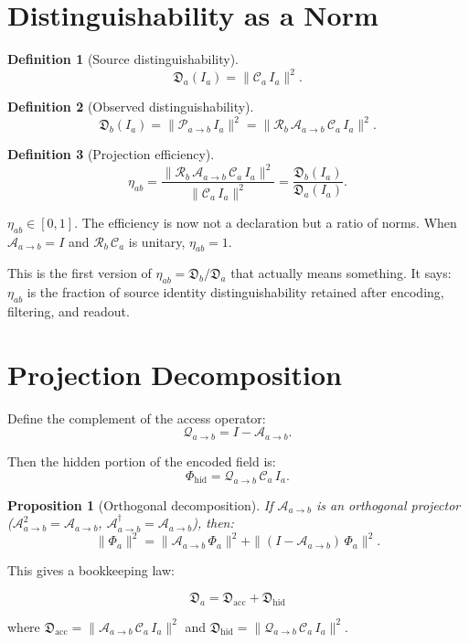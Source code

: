 \documentclass[11pt,a4paper,oneside]{article}
\newtheorem{definition}{Definition}[section]
\newtheorem{proposition}{Proposition}[section]
\newcommand{\Ia}{I_a}
\newcommand{\Pab}{\mathcal{P}_{a\to b}}
\newcommand{\Ca}{\mathcal{C}_a}
\newcommand{\Aab}{\mathcal{A}_{a\to b}}
\newcommand{\Rb}{\mathcal{R}_b}
\newcommand{\Qab}{\mathcal{Q}_{a\to b}}
\newcommand{\PhiA}{\Phi_a}              %
\newcommand{\PhiHid}{\Phi_{\mathrm{hid}}}  %
\newcommand{\Da}{\mathfrak{D}_a}
\newcommand{\Db}{\mathfrak{D}_b}
\newcommand{\Dhid}{\mathfrak{D}_{\mathrm{hid}}}
\newcommand{\Dacc}{\mathfrak{D}_{\mathrm{acc}}}
\newcommand{\etaab}{\eta_{ab}}
\begin{document}
\section{Distinguishability as a Norm}

\begin{definition}[Source distinguishability]
\[
\Da(\Ia) = \|\Ca\,\Ia\|^2.
\]
\end{definition}

\begin{definition}[Observed distinguishability]
\[
\Db(\Ia) = \|\Pab\,\Ia\|^2 = \|\Rb\,\Aab\,\Ca\,\Ia\|^2.
\]
\end{definition}

\begin{definition}[Projection efficiency]
\[
\boxed{\etaab = \frac{\|\Rb\,\Aab\,\Ca\,\Ia\|^2}{\|\Ca\,\Ia\|^2} = \frac{\Db(\Ia)}{\Da(\Ia)}.}
\]
\end{definition}

$\etaab \in [0,1]$. The efficiency is now not a declaration but a ratio of norms. When $\Aab = I$ and $\Rb\,\Ca$ is unitary, $\etaab = 1$.

This is the first version of $\etaab = \Db / \Da$ that actually means something. It says: $\etaab$ is the fraction of source identity distinguishability retained after encoding, filtering, and readout.

\section{Projection Decomposition}

Define the complement of the access operator:
\[
\Qab = I - \Aab.
\]

Then the hidden portion of the encoded field is:
\[
\PhiHid = \Qab\,\Ca\,\Ia.
\]

\begin{proposition}[Orthogonal decomposition]
If $\Aab$ is an orthogonal projector ($\Aab^2 = \Aab$, $\Aab^\dagger = \Aab$), then:
\[
\|\PhiA\|^2 = \|\Aab\,\PhiA\|^2 + \|(I - \Aab)\,\PhiA\|^2.
\]
\end{proposition}

This gives a bookkeeping law:

\[
\boxed{\Da = \Dacc + \Dhid}
\]

where $\Dacc = \|\Aab\,\Ca\,\Ia\|^2$ and $\Dhid = \|\Qab\,\Ca\,\Ia\|^2$.
\end{document}
